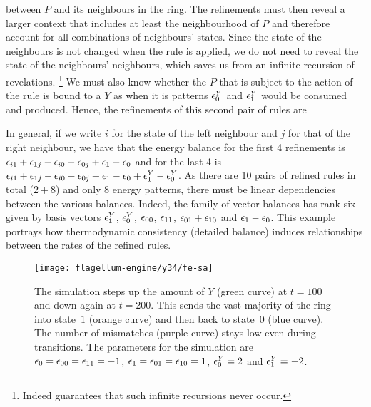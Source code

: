 between $P$ and its neighbours in the ring.
The refinements must then reveal a larger context
that includes at least the neighbourhood of $P$
and therefore account for all combinations of neighbours' states.
Since the state of the neighbours is not changed
when the rule is applied,
we do not need to reveal the state of the neighbours' neighbours,
which saves us from an infinite recursion of revelations.%
\footnote{
  Indeed  guarantees that
  such infinite recursions never occur.}
We must also know whether the $P$
that is subject to the action of the rule
is bound to a $Y$ as when it is %
patterns $\epsilon^Y_0$ and $\epsilon^Y_1$
would be consumed and produced.
Hence, the refinements of this second pair of rules are



In general, if we write $i$ for the state of the left neighbour
and $j$ for that of the right neighbour,
we have that the energy balance for the first 4 refinements is
$\epsilon_{i1}+\epsilon_{1j}-\epsilon_{i0}-\epsilon_{0j}+\epsilon_1-\epsilon_0$
and for the last 4 is
$\epsilon_{i1}+\epsilon_{1j}-\epsilon_{i0}-\epsilon_{0j}+\epsilon_1-\epsilon_0+
\epsilon^Y_1-\epsilon^Y_0$.
As there are 10 pairs of refined rules in total ($2+8$)
and only 8 energy patterns,
there must be linear dependencies between the various balances.
Indeed, the family of vector balances has rank six
given by basis vectors $\epsilon^Y_1$, $\epsilon^Y_0$,
$\epsilon_{00}$, $\epsilon_{11}$,
$\epsilon_{01}+\epsilon_{10}$ and $\epsilon_1-\epsilon_0$.
This example portrays how %
thermodynamic consistency (\ie detailed balance)
induces relationships between the rates of the refined rules.

\begin{figure}[t]
  \centering
  \texttt{[image: flagellum-engine/y34/fe-sa]}
  \caption{
    The simulation steps up the amount of $Y$ (green curve)
    at $t=100$ and down again at $t=200$.
    This sends the vast majority of the ring
    into state~$1$ (orange curve)
    and then back to state~$0$ (blue curve).
    The number of mismatches (purple curve) stays low
    even during transitions.
    The parameters for the simulation are
    $\epsilon_0 = \epsilon_{00} = \epsilon_{11} = -1$,
    $\epsilon_1 = \epsilon_{01} = \epsilon_{10} = 1$,
    $\epsilon^Y_0 = 2$ and $\epsilon^Y_1 = -2$.}
  \label{fig:PY}
\end{figure}

